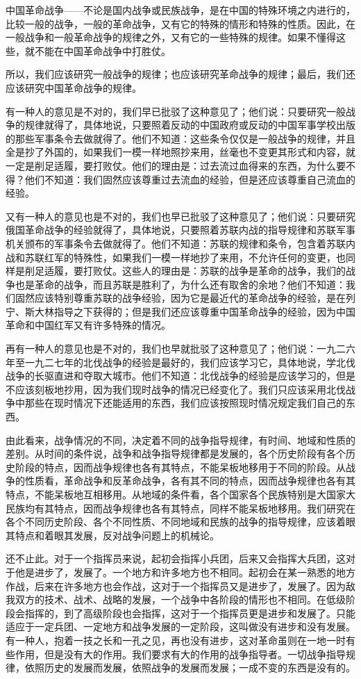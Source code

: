 中国革命战争——不论是国内战争或民族战争，是在中国的特殊环境之内进行的，比较一般的战争，一般的革命战争，又有它的特殊的情形和特殊的性质。因此，在一般战争和一般革命战争的规律之外，又有它的一些特殊的规律。如果不懂得这些，就不能在中国革命战争中打胜仗。

所以，我们应该研究一般战争的规律；也应该研究革命战争的规律；最后，我们还应该研究中国革命战争的规律。

有一种人的意见是不对的，我们早已批驳了这种意见了；他们说：只要研究一般战争的规律就得了，具体地说，只要照着反动的中国政府或反动的中国军事学校出版的那些军事条令去做就得了。他们不知道：这些条令仅仅是一般战争的规律，并且全是抄了外国的，如果我们一模一样地照抄来用，丝毫也不变更其形式和内容，就一定是削足适履，要打败仗。他们的理由是：过去流过血得来的东西，为什么要不得？他们不知道：我们固然应该尊重过去流血的经验，但是还应该尊重自己流血的经验。

又有一种人的意见也是不对的，我们也早已批驳了这种意见了；他们说：只要研究俄国革命战争的经验就得了，具体地说，只要照着苏联内战的指导规律和苏联军事机关颁布的军事条令去做就得了。他们不知道：苏联的规律和条令，包含着苏联内战和苏联红军的特殊性，如果我们一模一样地抄了来用，不允许任何的变更，也同样是削足适履，要打败仗。这些人的理由是：苏联的战争是革命的战争，我们的战争也是革命的战争，而且苏联是胜利了，为什么还有取舍的余地？他们不知道：我们固然应该特别尊重苏联的战争经验，因为它是最近代的革命战争的经验，是在列宁、斯大林指导之下获得的；但是我们还应该尊重中国革命战争的经验，因为中国革命和中国红军又有许多特殊的情况。

再有一种人的意见也是不对的，我们也早就批驳了这种意见了；他们说：一九二六年至一九二七年的北伐战争的经验是最好的，我们应该学习它，具体地说，学北伐战争的长驱直进和夺取大城市。他们不知道：北伐战争的经验是应该学习的，但是不应该刻板地抄用，因为我们现时战争的情况已经变化了。我们只应该采用北伐战争中那些在现时情况下还能适用的东西，我们应该按照现时情况规定我们自己的东西。

由此看来，战争情况的不同，决定着不同的战争指导规律，有时间、地域和性质的差别。从时间的条件说，战争和战争指导规律都是发展的，各个历史阶段有各个历史阶段的特点，因而战争规律也各有其特点，不能呆板地移用于不同的阶段。从战争的性质看，革命战争和反革命战争，各有其不同的特点，因而战争规律也各有其特点，不能呆板地互相移用。从地域的条件看，各个国家各个民族特别是大国家大民族均有其特点，因而战争规律也各有其特点，同样不能呆板地移用。我们研究在各个不同历史阶段、各个不同性质、不同地域和民族的战争的指导规律，应该着眼其特点和着眼其发展，反对战争问题上的机械论。

还不止此。对于一个指挥员来说，起初会指挥小兵团，后来又会指挥大兵团，这对于他是进步了，发展了。一个地方和许多地方也不相同。起初会在某一熟悉的地方作战，后来在许多地方也会作战，这对于一个指挥员又是进步了，发展了。因为敌我双方的技术、战术、战略的发展，一个战争中各阶段的情形也不相同。在低级阶段会指挥的，到了高级阶段也会指挥，这对于一个指挥员更是进步和发展了。只能适应于一定兵团、一定地方和战争发展的一定阶段，这叫做没有进步和没有发展。有一种人，抱着一技之长和一孔之见，再也没有进步，这对革命虽则在一地一时有些作用，但是没有大的作用。我们要求有大的作用的战争指导者。一切战争指导规律，依照历史的发展而发展，依照战争的发展而发展；一成不变的东西是没有的。

